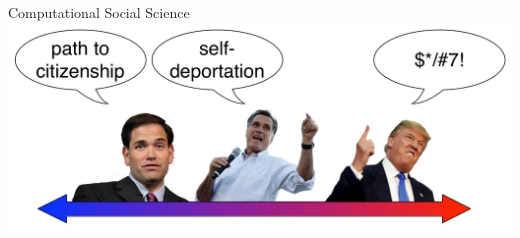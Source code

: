 \documentclass[compress]{beamer}
\begin{document}
{\begin{columns}
   \begin{block}{Computational Social Science}
     \centering
     \includegraphics[width=0.9\linewidth]{teaparty/figures/framing}
     \\
     \small
     \cite{nguyen-13b,nguyen-15}
   \end{block}

\end{columns}

}


\end{document}
